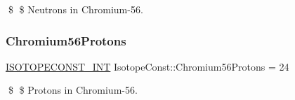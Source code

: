 \$ \$ Neutrons in Chromium-\/56. \mbox{\label{group___isotope_const-_chromium-_cr56_gabd098c5a3a6ef5d358f130938cf23648}} 
\subsubsection{\texorpdfstring{Chromium56\+Protons}{Chromium56Protons}}
{\footnotesize\ttfamily \mbox{\hyperlink{group___isotope_const-_macros_ga5f18360b3e99483a35c32d789e62621c}{I\+S\+O\+T\+O\+P\+E\+C\+O\+N\+S\+T\+\_\+\+I\+NT}} Isotope\+Const\+::\+Chromium56\+Protons = 24}

\$ \$ Protons in Chromium-\/56. 